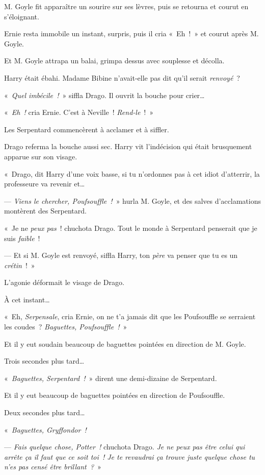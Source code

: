 M. Goyle fit apparaître un sourire sur ses lèvres, puis se retourna et courut en s'éloignant.

Ernie resta immobile un instant, surpris, puis il cria «~Eh~!~»
et courut après M. Goyle.

Et M. Goyle attrapa un balai, grimpa dessus avec souplesse et décolla.

Harry était ébahi.
Madame Bibine n'avait-elle pas dit qu'il serait \emph{renvoyé}~?

«~\emph{Quel imbécile~!}~» siffla Drago.
Il ouvrit la bouche pour crier…

«~\emph{Eh~!} cria Ernie.
C'est à Neville~!
\emph{Rend-le}~!~»

Les Serpentard commencèrent à acclamer et à siffler.

Drago referma la bouche aussi sec.
Harry vit l'indécision qui était brusquement apparue sur son visage.

«~Drago, dit Harry d'une voix basse, si tu n'ordonnes pas à cet idiot d'atterrir, la professeure va revenir et…

--- \emph{Viens le chercher, Poufsouffle~!}~» hurla M. Goyle, et des salves d'acclamations montèrent des Serpentard.

«~Je ne \emph{peux pas}~! chuchota Drago.
Tout le monde à Serpentard penserait que je suis \emph{faible}~!

--- Et si M. Goyle est renvoyé, siffla Harry, ton \emph{père} va penser que tu es un \emph{crétin}~!~»

L'agonie déformait le visage de Drago.

À cet instant…

«~Eh, \emph{Serpensale}, cria Ernie, on ne t'a jamais dit que les Poufsouffle se serraient les coudes~?
\emph{Baguettes, Poufsouffle~!}~»

Et il y eut soudain beaucoup de baguettes pointées en direction de M. Goyle.

Trois secondes plus tard…

«~\emph{Baguettes, Serpentard~!}~» dirent une demi-dizaine de Serpentard.

Et il y eut beaucoup de baguettes pointées en direction de Poufsouffle.

Deux secondes plus tard…

«~\emph{Baguettes, Gryffondor~!}

--- \emph{Fais quelque chose, Potter~!} chuchota Drago.
\emph{Je ne peux pas être celui qui arrête ça il faut que ce soit toi~!
Je te revaudrai ça trouve juste quelque chose tu n'es pas censé être brillant~?}~»

